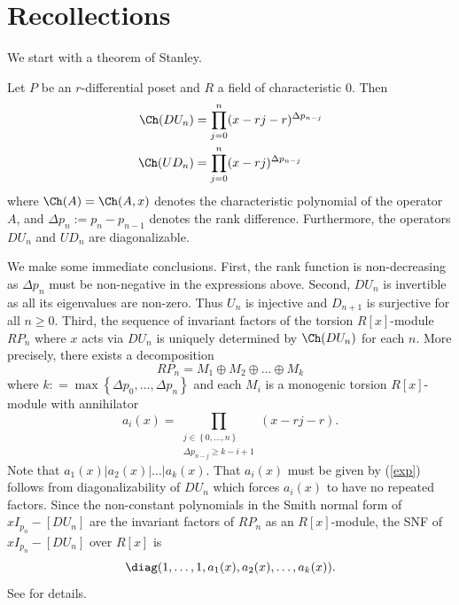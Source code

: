 \section{Recollections}   
\label{recoll}    

We start with a theorem of Stanley. 
\begin{theorem} \cite[\S 4]{Stanley88}    \label{Stanley}         Let $P$ be  an  $r$-differential poset and $ R $ a field of characteristic $ 0 $. Then
\[
\begin{aligned}
\Ch(DU_{n}) &=\prod_{j=0}^n (x - r j - r  )^{\Delta p_{n-j}} \\
\Ch(UD_n) &=\prod_{j=0}^n (x - r j  )^{\Delta p_{n-j}}
\end{aligned}
\]
where $ \Ch(A) = \Ch(A,x) $ denotes the characteristic polynomial of the operator $ A$, and $ \Delta p_n:=p_n - p_{n-1} $ denotes the rank difference.  Furthermore, the operators $ DU_{n} $ and $ UD_{n} $ are diagonalizable.                                                                                   
\end{theorem}


We make some immediate conclusions. First, the rank function is non-decreasing as $ \Delta   p_{n} $ must be non-negative in the expressions above. Second, $ DU_{n} $ is invertible as all its eigenvalues are non-zero.  Thus $ U_{n} $ is injective and $ D_{n+1} $ is surjective for all $ n \geq 0 $.   Third, the  sequence of  invariant factors of the torsion  $ R[x] $-module $ RP_{n} $ where $ x $ acts via $ DU_{n} $ is uniquely determined by $  \Ch (DU_{n}) $ for each $n$.  More precisely, there exists a decomposition  $$ RP_{n} =  M_{1} \oplus M_{2} \oplus  \ldots \oplus  M_{k} $$ where $  k  : =  \max           \left \{    \Delta p_{0}, \ldots, \Delta p_{n} \right \}   $  and each $ M_{i} $ is a monogenic  torsion $R[x] $-module with annihilator  \begin{equation} 
\label{exp}  a_{i}(x)  =   \prod _{       \substack{ j \in \left  \{  0 , \ldots, n \right \}    \\ \Delta p_{n-j}  \geq k - i   +  1 }  }  ( x - rj- r)      .     
\end{equation}  Note that $  a_{1} (x) | a_{2}(x) | \ldots  |  a_{k  } ( x)    $. That $ a_{i}(x) $ must be given by (\ref{exp})     follows from diagonalizability of $ DU_{n} $ which forces $ a_{i}(x) $ to have no repeated  factors.   Since the non-constant polynomials in the Smith normal form of  $ xI_{p_{n}} -   [DU_{n}]  %
$  are the invariant factors of $ R P_{n}   $ as an $R[x]$-module, the SNF of $ xI_{p_{n}} - [DU_{n}]    $     over $ R[x] $ is  $$ \diag( 1, \ldots, 1, a_{1}(x) , a_{2}(x), \ldots, a_{k}(x) ) . $$          
%
See \cite[\S 8.2]{Miller} for  details.    



